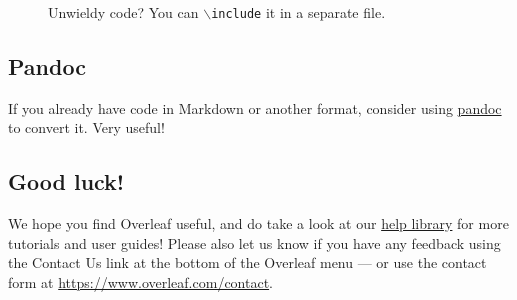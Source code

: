 \documentclass{article}
\begin{document}
\begin{figure}
    \centering
    
    \caption{Unwieldy code? You can \texttt{$\backslash$include} it in a separate file. }
    \label{fig:tikz2}
\end{figure}

\subsection{Pandoc}
If you already have code in Markdown or another format, consider using \href{https://pandoc.org/demos.html}{pandoc} to convert it. Very useful!



\subsection{Good luck!}

We hope you find Overleaf useful, and do take a look at our \href{https://www.overleaf.com/learn}{help library} for more tutorials and user guides! Please also let us know if you have any feedback using the Contact Us link at the bottom of the Overleaf menu --- or use the contact form at \url{https://www.overleaf.com/contact}.




\newpage
\printindex
\end{document}

